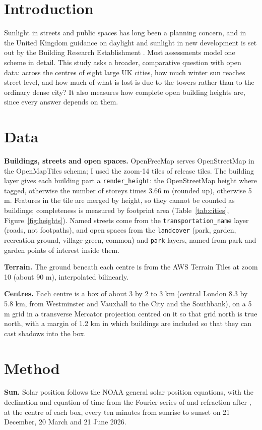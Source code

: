 \documentclass[11pt,a4paper]{article}
\begin{document}
\section{Introduction}
Sunlight in streets and public spaces has long been a planning concern, and in the United Kingdom guidance on daylight and sunlight in new development is set out by the Building Research Establishment \citep{bre2022}. Most assessments model one scheme in detail. This study asks a broader, comparative question with open data: across the centres of eight large UK cities, how much winter sun reaches street level, and how much of what is lost is due to the towers rather than to the ordinary dense city? It also measures how complete open building heights are, since every answer depends on them.

\section{Data}
\textbf{Buildings, streets and open spaces.} OpenFreeMap \citep{openfreemap} serves OpenStreetMap \citep{osm} in the OpenMapTiles schema; I used the zoom-14 tiles of release {{tiles}}. The building layer gives each building part a \texttt{render\_height}: the OpenStreetMap height where tagged, otherwise the number of storeys times 3.66 m (rounded up), otherwise 5 m. Features in the tile are merged by height, so they cannot be counted as buildings; completeness is measured by footprint area (Table~\ref{tab:cities}, Figure~\ref{fig:heights}). Named streets come from the \texttt{transportation\_name} layer (roads, not footpaths), and open spaces from the \texttt{landcover} (park, garden, recreation ground, village green, common) and \texttt{park} layers, named from park and garden points of interest inside them.

\textbf{Terrain.} The ground beneath each centre is from the AWS Terrain Tiles at zoom 10 (about 90 m), interpolated bilinearly.

\textbf{Centres.} Each centre is a box of about 3 by 2 to 3 km (central London 8.3 by 5.8 km, from Westminster and Vauxhall to the City and the Southbank), on a 5 m grid in a transverse Mercator projection centred on it so that grid north is true north, with a margin of 1.2 km in which buildings are included so that they can cast shadows into the box.

\section{Method}
\textbf{Sun.} Solar position follows the NOAA general solar position equations, with the declination and equation of time from the Fourier series of \citet{spencer1971} and refraction after \citet{saemundsson1986}, at the centre of each box, every ten minutes from sunrise to sunset on 21 December, 20 March and 21 June 2026.
\end{document}
